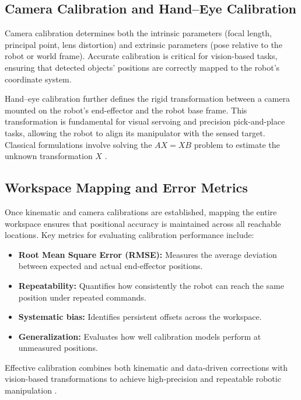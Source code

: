 \subsection{Camera Calibration and Hand–Eye Calibration}

Camera calibration determines both the intrinsic parameters (focal length, principal point, lens distortion) and extrinsic parameters (pose relative to the robot or world frame). Accurate calibration is critical for vision-based tasks, ensuring that detected objects’ positions are correctly mapped to the robot’s coordinate system.  

Hand–eye calibration further defines the rigid transformation between a camera mounted on the robot’s end-effector and the robot base frame. This transformation is fundamental for visual servoing and precision pick-and-place tasks, allowing the robot to align its manipulator with the sensed target. Classical formulations involve solving the $AX = XB$ problem to estimate the unknown transformation $X$ \cite{Fang2002, Parisa2016}.

\subsection{Workspace Mapping and Error Metrics}

Once kinematic and camera calibrations are established, mapping the entire workspace ensures that positional accuracy is maintained across all reachable locations. Key metrics for evaluating calibration performance include:
\begin{itemize}
    \item \textbf{Root Mean Square Error (RMSE):} Measures the average deviation between expected and actual end-effector positions.
    \item \textbf{Repeatability:} Quantifies how consistently the robot can reach the same position under repeated commands.
    \item \textbf{Systematic bias:} Identifies persistent offsets across the workspace.
    \item \textbf{Generalization:} Evaluates how well calibration models perform at unmeasured positions.
\end{itemize}

Effective calibration combines both kinematic and data-driven corrections with vision-based transformations to achieve high-precision and repeatable robotic manipulation \cite{Bai2023, MDPI2023}.